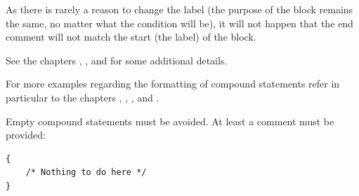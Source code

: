 As there is rarely a reason to change the label (the purpose of the block remains the same, no matter what the condition will be), it will not happen that the end comment will not match the start  (the label) of the block.

See the chapters , , and  for some additional details. 

For more examples regarding the formatting of compound statements refer in particular to the chapters , , , and .

Empty compound statements must be avoided. At least a comment must be provided:
\begin{lstlisting}
{
    /* Nothing to do here */
}
\end{lstlisting}









